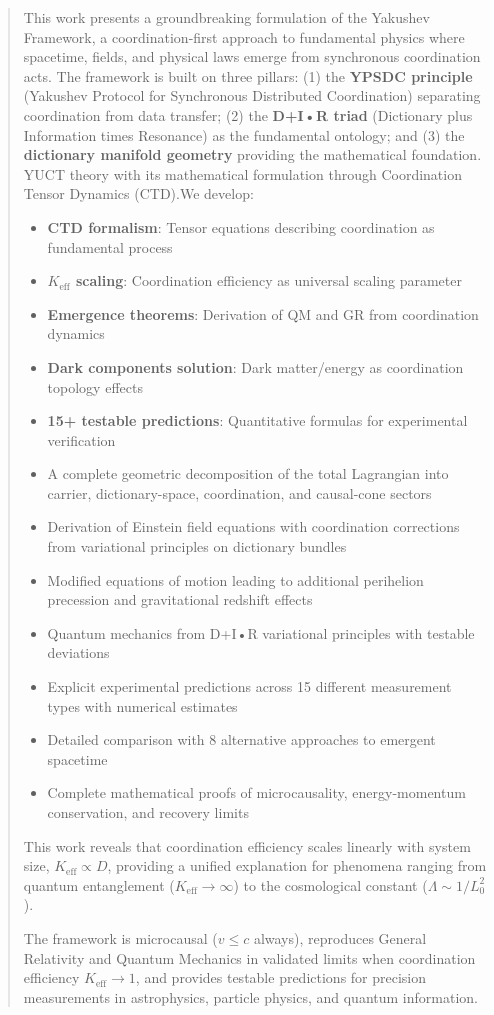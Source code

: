 \documentclass[11pt,a4paper]{article}
\begin{document}
	\begin{abstract}
		This work presents a groundbreaking formulation of the Yakushev Framework, a coordination-first approach to fundamental physics where spacetime, fields, and physical laws emerge from synchronous coordination acts. The framework is built on three pillars: (1) the \textbf{YPSDC principle} (Yakushev Protocol for Synchronous Distributed Coordination) separating coordination from data transfer; (2) the \textbf{D+I•R triad} (Dictionary plus Information times Resonance) as the fundamental ontology; and (3) the \textbf{dictionary manifold geometry} providing the mathematical foundation. YUCT theory with its mathematical formulation through Coordination Tensor Dynamics (CTD).We develop:
		\begin{itemize}
			\item \textbf{CTD formalism}: Tensor equations describing coordination as fundamental process
			\item \textbf{$K_{\mathrm{eff}}$ scaling}: Coordination efficiency as universal scaling parameter
			\item \textbf{Emergence theorems}: Derivation of QM and GR from coordination dynamics
			\item \textbf{Dark components solution}: Dark matter/energy as coordination topology effects
			\item \textbf{15+ testable predictions}: Quantitative formulas for experimental verification
			\item A complete geometric decomposition of the total Lagrangian into carrier, dictionary-space, coordination, and causal-cone sectors
			\item Derivation of Einstein field equations with coordination corrections from variational principles on dictionary bundles
			\item Modified equations of motion leading to additional perihelion precession and gravitational redshift effects
			\item Quantum mechanics from D+I•R variational principles with testable deviations
			\item Explicit experimental predictions across 15 different measurement types with numerical estimates
			\item Detailed comparison with 8 alternative approaches to emergent spacetime
			\item Complete mathematical proofs of microcausality, energy-momentum conservation, and recovery limits
		\end{itemize}
		This work reveals that coordination efficiency scales linearly with system 
		size, $K_{\mathrm{eff}} \propto D$, providing a unified explanation for 
		phenomena ranging from quantum entanglement ($K_{\mathrm{eff}} \to \infty$) 
		to the cosmological constant ($\Lambda \sim 1/L_0^2$).
		
		The framework is microcausal ($v \leq c$ always), reproduces General Relativity and Quantum Mechanics in validated limits when coordination efficiency $K_{\mathrm{eff}} \to 1$, and provides testable predictions for precision measurements in astrophysics, particle physics, and quantum information.
	\end{abstract}
	
\end{document}
